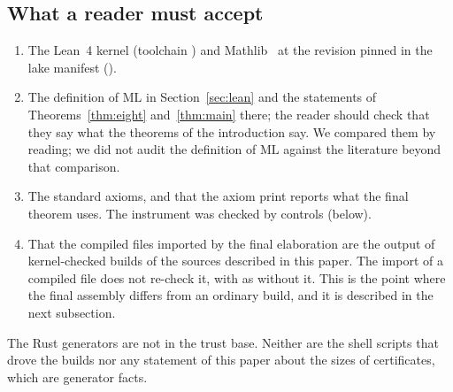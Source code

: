 \documentclass[11pt]{article}
\theoremstyle{remark}
\newcommand{\ML}{\mathrm{ML}}
\begin{document}
\subsection{What a reader must accept}
\begin{enumerate}
\item The Lean~4 kernel (toolchain ) and Mathlib~\cite{Mathlib} at the revision pinned in the lake manifest ().
\item The definition of $\ML$ in Section~\ref{sec:lean} and the statements of Theorems~\ref{thm:eight} and~\ref{thm:main} there; the reader should check that they say what the theorems of the introduction say. We compared them by reading; we did not audit the definition of $\ML$ against the literature beyond that comparison.
\item The standard axioms, and that the axiom print reports what the final theorem uses. The instrument was checked by controls (below).
\item That the compiled files imported by the final elaboration are the output of kernel-checked builds of the sources described in this paper. The import of a compiled file does not re-check it, with  as without it. This is the point where the final assembly differs from an ordinary  build, and it is described in the next subsection.
\end{enumerate}
The Rust generators are not in the trust base. Neither are the shell scripts that drove the builds nor any statement of this paper about the sizes of certificates, which are generator facts.
\end{document}
